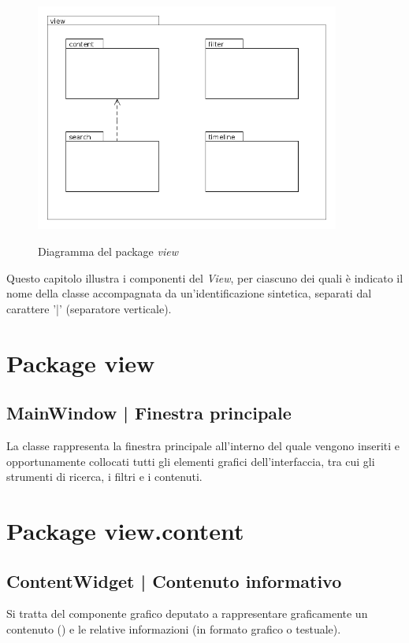 \documentclass[10pt,a4paper,headinclude,footinclude,hidelinks]{scrreprt} %
\begin{document}
	\begin{figure}[ht]
		\begin{center}
	    	\includegraphics[width=10cm]{package/view.png}
			\label{gfx:package:view}
			\caption{Diagramma del package \textit{view}}
		\end{center}
	\end{figure}

	Questo capitolo illustra i componenti del \textit{View}, per ciascuno dei quali è indicato il nome della classe accompagnata da un'identificazione sintetica, separati dal carattere '|' (separatore verticale).

	\section{Package view}
	\label{sec:stage:design:view}
	
	\subsection[MainWindow]{MainWindow | Finestra principale}
	\label{sec:stage:design:view:window}
	La classe \textit{} rappresenta la finestra principale all'interno del quale vengono inseriti e opportunamente collocati tutti gli elementi grafici dell'interfaccia, tra cui gli strumenti di ricerca, i filtri e i contenuti.

	\section{Package view.content}
	\label{sec:stage:design:view.content}

	\subsection[ContentWidget]{ContentWidget | Contenuto informativo}
	\label{sec:stage:design:view:content-widget}
	Si tratta del componente grafico deputato a rappresentare graficamente un contenuto (\textit{}) e le relative informazioni (in formato grafico o testuale).
\end{document}

